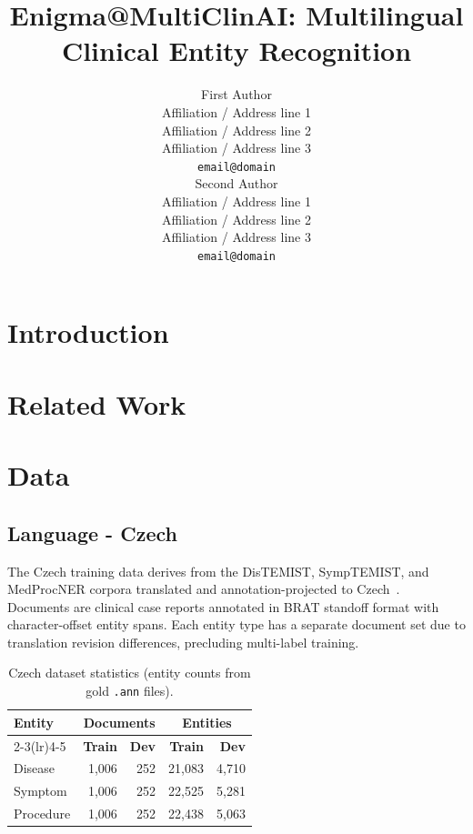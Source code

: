\documentclass[11pt]{article}
\title{Enigma@MultiClinAI: Multilingual Clinical Entity Recognition}
\author{First Author \\
  Affiliation / Address line 1 \\
  Affiliation / Address line 2 \\
  Affiliation / Address line 3 \\
  \texttt{email@domain} \\\And
  Second Author \\
  Affiliation / Address line 1 \\
  Affiliation / Address line 2 \\
  Affiliation / Address line 3 \\
  \texttt{email@domain} \\}
\begin{document}
\maketitle
\begin{abstract}

\end{abstract}

\section{Introduction}

\section{Related Work}

\section{Data}

\subsection{Language - Czech}

The Czech training data derives from the DisTEMIST, SympTEMIST, and MedProcNER corpora
translated and annotation-projected to Czech~\cite{multiclinai2026}.
Documents are clinical case reports annotated in BRAT standoff format with character-offset
entity spans. Each entity type has a separate document set due to translation revision
differences, precluding multi-label training.

\begin{table}[h]
\centering
\small
\begin{tabular}{lrrrr}
\toprule
\textbf{Entity} & \multicolumn{2}{c}{\textbf{Documents}} & \multicolumn{2}{c}{\textbf{Entities}} \\
\cmidrule(lr){2-3}\cmidrule(lr){4-5}
 & \textbf{Train} & \textbf{Dev} & \textbf{Train} & \textbf{Dev} \\
\midrule
Disease   & 1,006 & 252 & 21,083 & 4,710 \\
Symptom   & 1,006 & 252 & 22,525 & 5,281 \\
Procedure & 1,006 & 252 & 22,438 & 5,063 \\
\bottomrule
\end{tabular}
\caption{Czech dataset statistics (entity counts from gold \texttt{.ann} files).}
\label{tab:cz-data}
\end{table}
\end{document}

